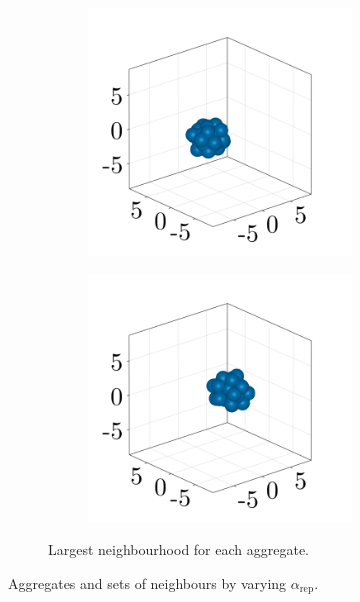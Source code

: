 \begin{figure}[ht]
\begin{subfigure}{\textwidth}
\begin{subfigure}{0.22\textwidth}
        \end{subfigure}
        \hfill
        \begin{subfigure}{0.22\textwidth}
            \centering
            \includegraphics[width=\textwidth]{figures/303/303-aggregates-reps-nbs-2dot5.png}
        \end{subfigure}
        \hfill
        \begin{subfigure}{0.22\textwidth}
            \centering
            \includegraphics[width=\textwidth]{figures/303/303-aggregates-reps-nbs-3.png}
        \end{subfigure}
        \caption{Largest neighbourhood for each aggregate.}
    \end{subfigure}
    \caption{Aggregates and sets of neighbours by varying $\alpha_\text{rep}$.}
    \label{fig:aggregates_reps}
\end{figure}

